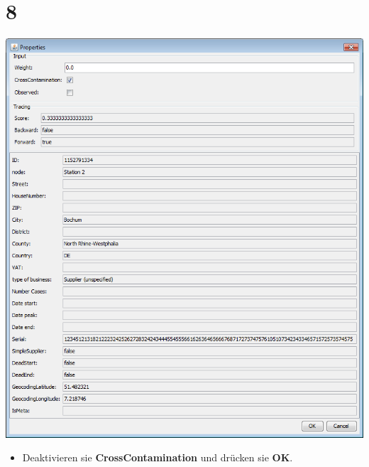 \documentclass{beamer}
\begin{document}
\section{8}
\begin{frame}
	\begin{center}
  		\includegraphics[height=0.6\textheight]{8.png}
	\end{center}
	\begin{itemize}
		\item Deaktivieren sie \textbf{CrossContamination} und drücken sie \textbf{OK}.
	\end{itemize}
\end{frame}
\end{document}

